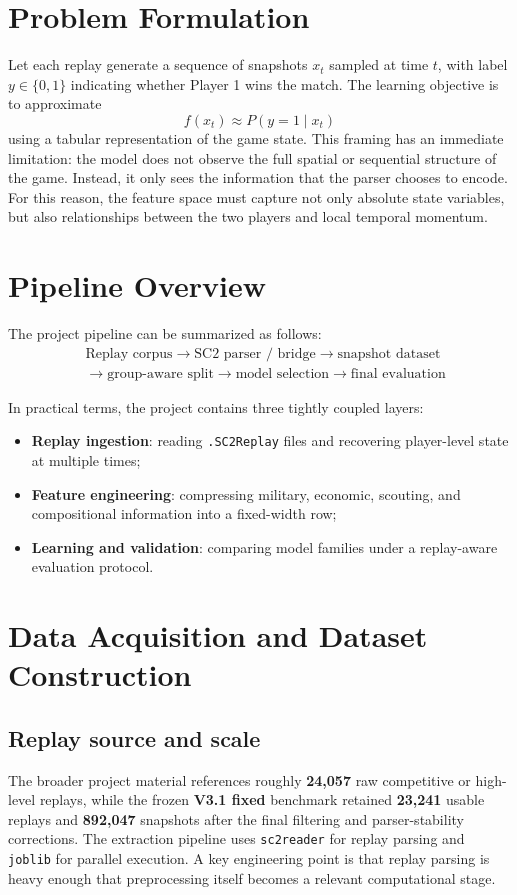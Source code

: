 \documentclass[11pt,a4paper]{article}
\begin{document}
	\section{Problem Formulation}
	Let each replay generate a sequence of snapshots $x_t$ sampled at time $t$, with label $y \in \{0,1\}$ indicating whether Player 1 wins the match. The learning objective is to approximate
	\[
	f(x_t) \approx P(y=1 \mid x_t)
	\]
	using a tabular representation of the game state. This framing has an immediate limitation: the model does not observe the full spatial or sequential structure of the game. Instead, it only sees the information that the parser chooses to encode. For this reason, the feature space must capture not only absolute state variables, but also relationships between the two players and local temporal momentum.
	
	\section{Pipeline Overview}
	The project pipeline can be summarized as follows:
	\[
	\begin{aligned}
		&\text{Replay corpus} \rightarrow \text{SC2 parser / bridge} \rightarrow \text{snapshot dataset} \\
		&\rightarrow \text{group-aware split} \rightarrow \text{model selection} \rightarrow \text{final evaluation}
	\end{aligned}
	\]
	
	In practical terms, the project contains three tightly coupled layers:
	\begin{itemize}
		\item \textbf{Replay ingestion}: reading \texttt{.SC2Replay} files and recovering player-level state at multiple times;
		\item \textbf{Feature engineering}: compressing military, economic, scouting, and compositional information into a fixed-width row;
		\item \textbf{Learning and validation}: comparing model families under a replay-aware evaluation protocol.
	\end{itemize}
	
	\section{Data Acquisition and Dataset Construction}
	\subsection{Replay source and scale}
	The broader project material references roughly \textbf{24,057} raw competitive or high-level replays, while the frozen \textbf{V3.1 fixed} benchmark retained \textbf{23,241} usable replays and \textbf{892,047} snapshots after the final filtering and parser-stability corrections. The extraction pipeline uses \texttt{sc2reader} for replay parsing and \texttt{joblib} for parallel execution. A key engineering point is that replay parsing is heavy enough that preprocessing itself becomes a relevant computational stage.
	
\end{document}
